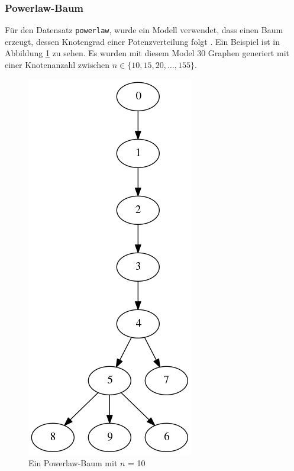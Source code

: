 \documentclass[12pt,a4paper,onecolumn,oneside,titlepage]{article}
\newcommand{\vars}{\texttt}
\begin{document}
\subsubsection{Powerlaw-Baum}
Für den Datensatz \vars{powerlaw}, wurde ein Modell verwendet, dass einen Baum erzeugt, dessen Knotengrad einer Potenzverteilung folgt \cite{Aiello01}. Ein Beispiel ist in Abbildung \ref{fig:powerlaw-tree} zu sehen.
Es wurden mit diesem Model 30 Graphen generiert mit einer Knotenanzahl zwischen $n \in \{10,15,20, \ldots,155\}$.
\begin{figure}
\includegraphics[scale=0.35]{dot/dot_powerlaw.png}
\caption{Ein Powerlaw-Baum mit $n$ = 10}
\label{fig:powerlaw-tree}
\end{figure}
\end{document}
